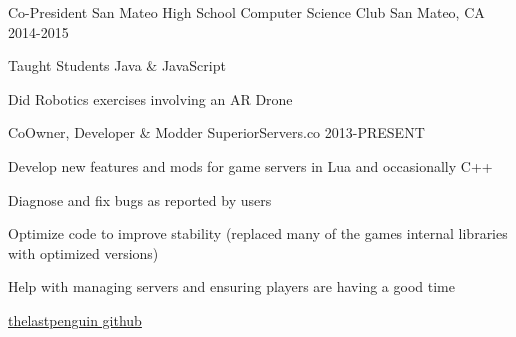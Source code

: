 \begin{cventries}
  \cventry
    {Co-President}
    {San Mateo High School Computer Science Club}
    {San Mateo, CA}
    {2014-2015}
    {
      \begin{cvitems}
        \item {Taught Students Java \& JavaScript}
        \item {Did Robotics exercises involving an AR Drone}
      \end{cvitems}
    }
  \cventry
    {CoOwner, Developer \& Modder}
    {SuperiorServers.co}
    {}
    {2013-PRESENT}
    {
      \begin{cvitems}
        \item {Develop new features and mods for game servers in Lua and occasionally C++}
        \item {Diagnose and fix bugs as reported by users}
        \item {Optimize code to improve stability (replaced many of the games internal libraries with optimized versions)}
        \item {Help with managing servers and ensuring players are having a good time}
        \item \href{https://github.com/thelastpenguin?tab=repositories}{thelastpenguin github}
      \end{cvitems}
    }
\end{cventries}

